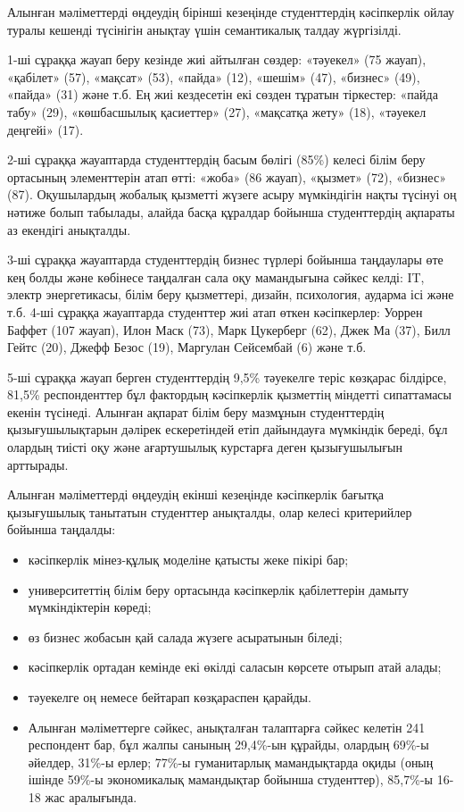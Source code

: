   

\begin{multicols}{2}

Алынған мәліметтерді өңдеудің бірінші кезеңінде студенттердің
кәсіпкерлік ойлау туралы кешенді түсінігін анықтау үшін семантикалық
талдау жүргізілді.

1-ші сұраққа жауап беру кезінде жиі айтылған сөздер: «тәуекел» (75
жауап), «қабілет» (57), «мақсат» (53), «пайда» (12), «шешім» (47),
«бизнес» (49), «пайда» (31) және т.б. Ең жиі кездесетін екі сөзден
тұратын тіркестер: «пайда табу» (29), «көшбасшылық қасиеттер» (27),
«мақсатқа жету» (18), «тәуекел деңгейі» (17).

2-ші сұраққа жауаптарда студенттердің басым бөлігі (85\%) келесі білім
беру ортасының элементтерін атап өтті: «жоба» (86 жауап), «қызмет» (72),
«бизнес» (87). Оқушылардың жобалық қызметті жүзеге асыру мүмкіндігін
нақты түсінуі оң нәтиже болып табылады, алайда басқа құралдар бойынша
студенттердің ақпараты аз екендігі анықталды.

3-ші сұраққа жауаптарда студенттердің бизнес түрлері бойынша таңдаулары
өте кең болды және көбінесе таңдалған сала оқу мамандығына сәйкес келді:
IT, электр энергетикасы, білім беру қызметтері, дизайн, психология,
аударма ісі және т.б. 4-ші сұраққа жауаптарда студенттер жиі атап өткен
кәсіпкерлер: Уоррен Баффет (107 жауап), Илон Маск (73), Марк Цукерберг
(62), Джек Ма (37), Билл Гейтс (20), Джефф Безос (19), Маргулан
Сейсембай (6) және т.б.

5-ші сұраққа жауап берген студенттердің 9,5\% тәуекелге теріс көзқарас
білдірсе, 81,5\% респонденттер бұл фактордың кәсіпкерлік қызметтің
міндетті сипаттамасы екенін түсінеді. Алынған ақпарат білім беру
мазмұнын студенттердің қызығушылықтарын дәлірек ескеретіндей етіп
дайындауға мүмкіндік береді, бұл олардың тиісті оқу және ағартушылық
курстарға деген қызығушылығын арттырады.

Алынған мәліметтерді өңдеудің екінші кезеңінде кәсіпкерлік бағытқа
қызығушылық танытатын студенттер анықталды, олар келесі критерийлер
бойынша таңдалды:

\begin{itemize}[left=0.5cm]
\item
  кәсіпкерлік мінез-құлық моделіне қатысты жеке пікірі бар;
\item
  университеттің білім беру ортасында кәсіпкерлік қабілеттерін дамыту
  мүмкіндіктерін көреді;
\item
  өз бизнес жобасын қай салада жүзеге асыратынын біледі;
\item
  кәсіпкерлік ортадан кемінде екі өкілді саласын көрсете отырып атай
  алады;
\item
  тәуекелге оң немесе бейтарап көзқараспен қарайды.
\item
  Алынған мәліметтерге сәйкес, анықталған талаптарға сәйкес келетін 241
  респондент бар, бұл жалпы санының 29,4\%-ын құрайды, олардың 69\%-ы
  әйелдер, 31\%-ы ерлер; 77\%-ы гуманитарлық мамандықтарда оқиды (оның
  ішінде 59\%-ы экономикалық мамандықтар бойынша студенттер), 85,7\%-ы
  16-18 жас аралығында.
\end{itemize}


\end{multicols}
